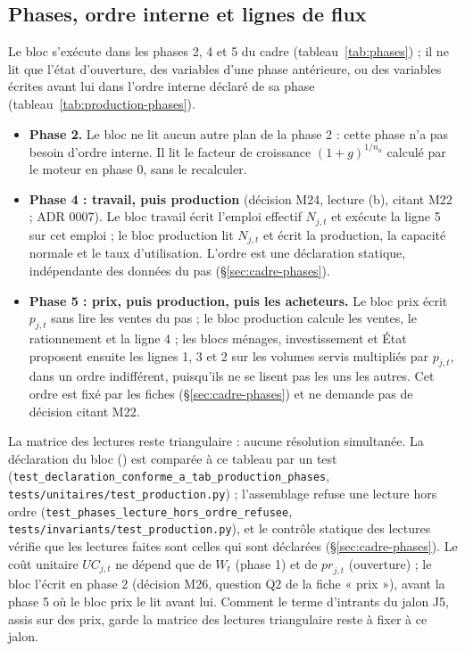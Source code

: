 \documentclass[11pt,a4paper]{article}
\newcommand{\code}[1]{\texttt{\detokenize{#1}}}
\begin{document}
\subsection{Phases, ordre interne et lignes de flux}
\label{sec:production-phases}
Le bloc s'exécute dans les phases 2, 4 et 5 du cadre (tableau~\ref{tab:phases}) ; il ne lit que l'état d'ouverture, des variables d'une phase antérieure, ou des variables écrites avant lui dans l'ordre interne déclaré de sa phase (tableau~\ref{tab:production-phases}).
\begin{itemize}
\item \textbf{Phase 2.} Le bloc ne lit aucun autre plan de la phase 2 : cette phase n'a pas besoin d'ordre interne. Il lit le facteur de croissance $(1 + g)^{1/n_a}$ calculé par le moteur en phase 0, sans le recalculer.
\item \textbf{Phase 4 : travail, puis production} (décision M24, lecture (b), citant M22 ; ADR 0007). Le bloc travail écrit l'emploi effectif $N_{j,t}$ et exécute la ligne 5 sur cet emploi ; le bloc production lit $N_{j,t}$ et écrit la production, la capacité normale et le taux d'utilisation. L'ordre est une déclaration statique, indépendante des données du pas (\S\ref{sec:cadre-phases}).
\item \textbf{Phase 5 : prix, puis production, puis les acheteurs.} Le bloc prix écrit $p_{j,t}$ sans lire les ventes du pas ; le bloc production calcule les ventes, le rationnement et la ligne 4 ; les blocs ménages, investissement et État proposent ensuite les lignes 1, 3 et 2 sur les volumes servis multipliés par $p_{j,t}$, dans un ordre indifférent, puisqu'ils ne se lisent pas les uns les autres. Cet ordre est fixé par les fiches (\S\ref{sec:cadre-phases}) et ne demande pas de décision citant M22.
\end{itemize}
{\setlength{\emergencystretch}{3em}La matrice des lectures reste triangulaire : aucune résolution simultanée. La déclaration du bloc (\code{nations.blocs.production.Production}) est comparée à ce tableau par un test (\nolinkurl{test_declaration_conforme_a_tab_production_phases}, \nolinkurl{tests/unitaires/test_production.py}) ; l'assemblage refuse une lecture hors ordre (\nolinkurl{test_phases_lecture_hors_ordre_refusee}, \nolinkurl{tests/invariants/test_production.py}), et le contrôle statique des lectures vérifie que les lectures faites sont celles qui sont déclarées (\S\ref{sec:cadre-phases}). Le coût unitaire $\mathit{UC}_{j,t}$ ne dépend que de $W_t$ (phase 1) et de $\mathit{pr}_{j,t}$ (ouverture) ; le bloc l'écrit en phase 2 (décision M26, question Q2 de la fiche « prix »), avant la phase 5 où le bloc prix le lit avant lui. Comment le terme d'intrants du jalon J5, assis sur des prix, garde la matrice des lectures triangulaire reste à fixer à ce jalon.\par}
\end{document}

